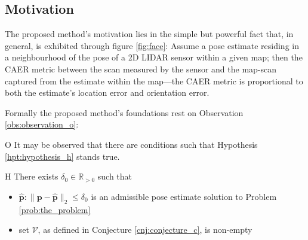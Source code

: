 \subsection{Motivation}

The proposed method's motivation lies in the simple but powerful fact that, in
general, is exhibited through figure \ref{fig:face}: Assume a pose estimate
residing in a neighbourhood of the pose of a 2D LIDAR sensor within a given
map; then the CAER metric between the scan measured by the sensor and the
map-scan captured from the estimate within the map---the CAER metric is
proportional to both the estimate's location error and orientation error.

Formally the proposed method's foundations rest on Observation
\ref{obs:observation_o}:

\begin{customobs}{O}
  \label{obs:observation_o} It may be observed that there are conditions such
  that Hypothesis \ref{hpt:hypothesis_h} stands true.
\end{customobs}

\begin{customhpt}{H}
  \label{hpt:hypothesis_h}
  There exists $\delta_0 \in \mathbb{R}_{> 0}$ such that
  \begin{itemize}
    \item $\hat{\bm{p}}: \|\bm{p}-\hat{\bm{p}}\|_2 \leq \delta_0$ is an
          admissible pose estimate solution to Problem \ref{prob:the_problem}
    \item set $\mathcal{V}$, as defined in Conjecture \ref{cnj:conjecture_c},
          is non-empty
  \end{itemize}
\end{customhpt}

